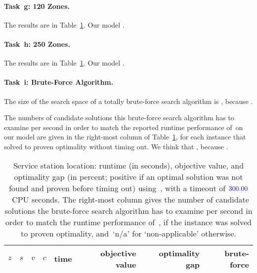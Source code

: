 \paragraph{Task~g: 120 Zones.}
The results are in Table~\ref{tab:res:mip}.
%
Our model .

\paragraph{Task~h: 250 Zones.}
The results are in Table~\ref{tab:res:mip}.
%
Our model .

\paragraph{Task~i: Brute-Force Algorithm.}
The size of the search space of a totally brute-force search algorithm
is , because \todo{\filler}.

The numbers of candidate solutions this brute-force search algorithm
has to examine per second in order to match the reported runtime
performance of~\SolverMIP on our model are given in the right-most
column of Table~\ref{tab:res:mip}, for each instance that~\SolverMIP
solved to proven optimality without timing out.
%
We think that \todo{\filler}, because \todo{\filler}.

\begin{table}[t]  %
  \centering
  \begin{tabular}{rrrrrrrr}  %
    $z$ & $s$ & $v$ & $c$ & time & objective value & optimality gap & brute-force \\
    \midrule
  \end{tabular}
  \caption{Service station location: runtime (in seconds), objective
    value, and optimality gap (in percent; positive if an optimal
    solution was not found and proven before timing out)
    using~\SolverMIP, with a timeout of ${\color{blue}300.00}$~CPU seconds.
    The right-most column gives the number of candidate solutions the
    brute-force search algorithm has to examine per second in order to
    match the runtime performance of~\SolverMIP, if the instance was
    solved to proven optimality, and~`n/a' for `non-applicable'
    otherwise.
  }
  \label{tab:res:mip}
\end{table}

